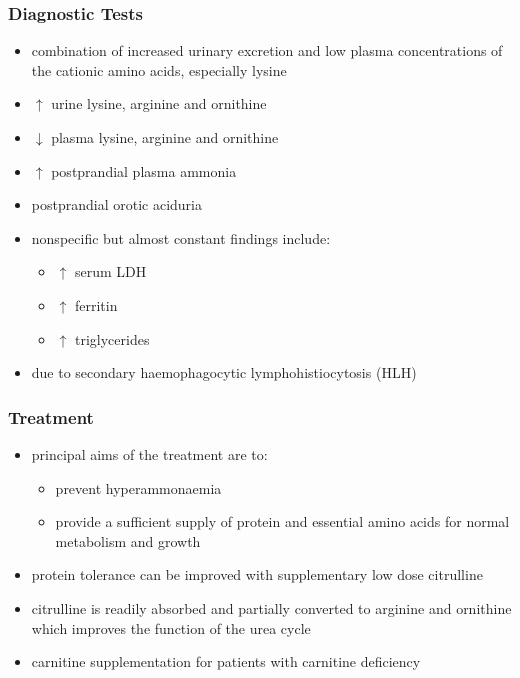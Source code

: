 \documentclass{scrartcl}
\begin{document}
\subsubsection{Diagnostic Tests}
\label{sec:org8d28c42}
\begin{itemize}
\item combination of increased urinary excretion and low plasma
concentrations of the cationic amino acids, especially lysine
\item \(\uparrow\) urine lysine, arginine and ornithine
\item \(\downarrow\) plasma lysine, arginine and ornithine
\item \(\uparrow\) postprandial plasma ammonia
\item postprandial orotic aciduria
\item nonspecific but almost constant findings include:
\begin{itemize}
\item \(\uparrow\)  serum LDH
\item \(\uparrow\) ferritin
\item \(\uparrow\) triglycerides
\end{itemize}
\item due to secondary haemophagocytic lymphohistiocytosis (HLH)
\end{itemize}

\subsubsection{Treatment}
\label{sec:org140fea6}
\begin{itemize}
\item principal aims of the treatment are to:
\begin{itemize}
\item prevent hyperammonaemia
\item provide a sufficient supply of protein and essential amino acids
for normal metabolism and growth
\end{itemize}

\item protein tolerance can be improved with supplementary low dose
citrulline
\item citrulline is readily absorbed and partially converted to arginine
and ornithine which improves the function of the urea cycle
\item carnitine supplementation for patients with carnitine deficiency
\end{itemize}
\end{document}
